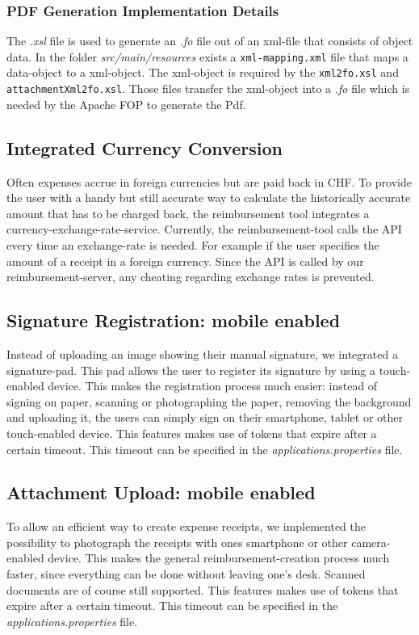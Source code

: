 \subsubsection{PDF Generation Implementation Details}
\label{subsubsec:pdf-xml-mappings}

The \textit{.xsl} file is used to generate an \textit{.fo} file out of an xml-file that consists of object data. In the folder \textit{src/main/resources} exists a \texttt{xml-mapping.xml} file that maps a data-object to a xml-object. The xml-object is required by the \texttt{xml2fo.xsl} and \texttt{attachmentXml2fo.xsl}. Those files transfer the xml-object into a \textit{.fo} file which is needed by the Apache FOP to generate the Pdf.

\subsection{Integrated Currency Conversion}
\label{feature:currency}
Often expenses accrue in foreign currencies but are paid back in CHF. To provide the user with a handy but still accurate way to calculate the historically accurate amount that has to be charged back, the reimbursement tool integrates a currency-exchange-rate-service. Currently, the reimbursement-tool calls the API every time an exchange-rate is needed. For example if the user specifies the amount of a receipt in a foreign currency. Since the API is called by our reimbursement-server, any cheating regarding exchange rates is prevented.


\subsection{Signature Registration: mobile enabled}
Instead of uploading an image showing their manual signature, we integrated a signature-pad. This pad allows the user to register its signature by using a touch-enabled device. This makes the registration process much easier: instead of signing on paper, scanning or photographing the paper, removing the background and uploading it, the users can simply sign on their smartphone, tablet or other touch-enabled device. This features makes use of tokens that expire after a certain timeout. This timeout can be specified in the \textit{applications.properties} file.

\subsection{Attachment Upload: mobile enabled}
To allow an efficient way to create expense receipts, we implemented the possibility to photograph the receipts with ones smartphone or other camera-enabled device. This makes the general reimbursement-creation process much faster, since everything can be done without leaving one's desk. Scanned documents are of course still supported. This features makes use of tokens that expire after a certain timeout. This timeout can be specified in the \textit{applications.properties} file.


